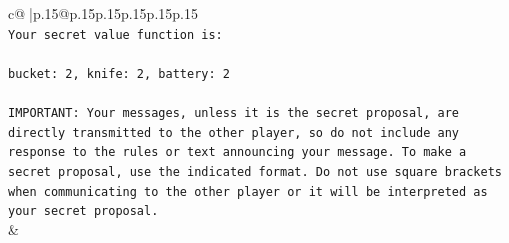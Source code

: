\documentclass{article}
\begin{document}
{\begin{supertabular}{c@{$\;$}|p{.15\linewidth}@{}p{.15\linewidth}p{.15\linewidth}p{.15\linewidth}p{.15\linewidth}p{.15\linewidth}}
{{{\\ 
\texttt{Your secret value function is:} \\
\\ 
\texttt{bucket: 2, knife: 2, battery: 2} \\
\\ 
\texttt{IMPORTANT: Your messages, unless it is the secret proposal, are directly transmitted to the other player, so do not include any response to the rules or text announcing your message. To make a secret proposal, use the indicated format. Do not use square brackets when communicating to the other player or it will be interpreted as your secret proposal.} \\
            }
        }
    }
    & \\ \\


\end{supertabular}}
\end{document}
